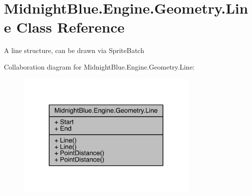 \hypertarget{class_midnight_blue_1_1_engine_1_1_geometry_1_1_line}{}\section{Midnight\+Blue.\+Engine.\+Geometry.\+Line Class Reference}
\label{class_midnight_blue_1_1_engine_1_1_geometry_1_1_line}


A line structure, can be drawn via Sprite\+Batch  




Collaboration diagram for Midnight\+Blue.\+Engine.\+Geometry.\+Line\+:
\nopagebreak
\begin{figure}[H]
\begin{center}
\leavevmode
\includegraphics[width=255pt]{class_midnight_blue_1_1_engine_1_1_geometry_1_1_line__coll__graph}
\end{center}
\end{figure}
